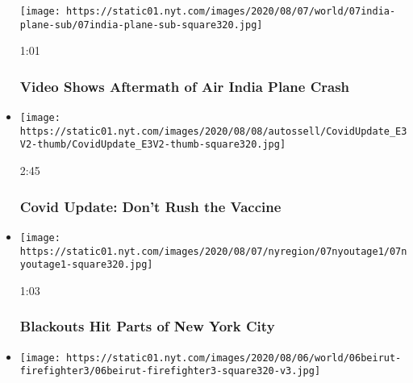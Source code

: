 \begin{itemize}
  \texttt{[image: https://static01.nyt.com/images/2020/08/07/world/07india-plane-sub/07india-plane-sub-square320.jpg]}

  1:01

  \hypertarget{video-shows-aftermath-of-air-india-plane-crash}{%
  \subsubsection{Video Shows Aftermath of Air India Plane
  Crash}\label{video-shows-aftermath-of-air-india-plane-crash}}
\item
  \href{https://www.nytimes.com/video/opinion/100000007278127/coronavirus-vaccine-update.html?action=click\&module=video-series-bar\&region=header\&pgtype=Article\&playlistId=video/latest-video}{}

  \texttt{[image: https://static01.nyt.com/images/2020/08/08/autossell/CovidUpdate\_E3V2-thumb/CovidUpdate\_E3V2-thumb-square320.jpg]}

  2:45

  \hypertarget{covid-update-dont-rush-the-vaccine}{%
  \subsubsection{Covid Update: Don't Rush the
  Vaccine}\label{covid-update-dont-rush-the-vaccine}}
\item
  \href{https://www.nytimes.com/video/us/100000007278113/blackouts-new-york-city.html?action=click\&module=video-series-bar\&region=header\&pgtype=Article\&playlistId=video/latest-video}{}

  \texttt{[image: https://static01.nyt.com/images/2020/08/07/nyregion/07nyoutage1/07nyoutage1-square320.jpg]}

  1:03

  \hypertarget{blackouts-hit-parts-of-new-york-city}{%
  \subsubsection{Blackouts Hit Parts of New York
  City}\label{blackouts-hit-parts-of-new-york-city}}
\item
  \href{https://www.nytimes.com/video/world/100000007277258/beirut-first-responder-funeral.html?action=click\&module=video-series-bar\&region=header\&pgtype=Article\&playlistId=video/latest-video}{}

  \texttt{[image: https://static01.nyt.com/images/2020/08/06/world/06beirut-firefighter3/06beirut-firefighter3-square320-v3.jpg]}


\end{itemize}
